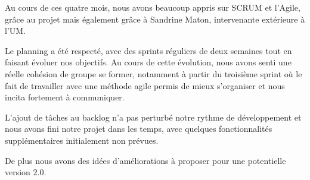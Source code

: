Au cours de ces quatre mois, nous avons beaucoup appris sur SCRUM et l'Agile, grâce au projet mais également grâce à Sandrine Maton, intervenante extérieure à l'UM.

Le planning a été respecté, avec des sprints réguliers de deux semaines tout en faisant évoluer nos objectifs.
Au cours de cette évolution, nous avons senti une réelle cohésion de groupe se former, notamment à partir du troisième sprint où le fait de travailler avec une méthode agile permis de mieux s'organiser et nous incita fortement à communiquer.

L'ajout de tâches au backlog n'a pas perturbé notre rythme de développement et nous avons fini notre projet dans les temps, avec quelques fonctionnalités supplémentaires initialement non prévues.

De plus nous avons des idées d'améliorations à proposer pour une potentielle version 2.0.
